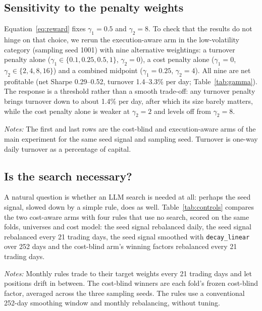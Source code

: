 \documentclass[preprint,12pt,authoryear]{elsarticle}
\newcommand{\tablenote}[1]{\par\vspace{0.4em}\begin{minipage}{\linewidth}\footnotesize #1\end{minipage}}
\begin{document}
\subsection{Sensitivity to the penalty weights}\label{sec:gamma}

Equation~\eqref{eq:reward} fixes $\gamma_1 = 0.5$ and $\gamma_2 = 8$. To check that the results do not hinge on that choice, we rerun the execution-aware arm in the low-volatility category (sampling seed 1001) with nine alternative weightings: a turnover penalty alone ($\gamma_1 \in \{0.1, 0.25, 0.5, 1\}$, $\gamma_2 = 0$), a cost penalty alone ($\gamma_1 = 0$, $\gamma_2 \in \{2, 4, 8, 16\}$) and a combined midpoint ($\gamma_1 = 0.25$, $\gamma_2 = 4$). All nine are net profitable (net Sharpe 0.29--0.52, turnover 1.4--3.3\% per day; Table~\ref{tab:gamma}). The response is a threshold rather than a smooth trade-off: any turnover penalty brings turnover down to about 1.4\% per day, after which its size barely matters, while the cost penalty alone is weaker at $\gamma_2 = 2$ and levels off from $\gamma_2 = 8$.

\begin{table}[t]
\centering
\caption{Penalty-weight sensitivity: execution-aware arm, low-volatility seed, LLM sampling seed 1001.}
\label{tab:gamma}
\footnotesize

\tablenote{\emph{Notes:} The first and last rows are the cost-blind and execution-aware arms of the main experiment for the same seed signal and sampling seed. Turnover is one-way daily turnover as a percentage of capital.}
\end{table}

\subsection{Is the search necessary?}\label{sec:controls}

A natural question is whether an LLM search is needed at all: perhaps the seed signal, slowed down by a simple rule, does as well. Table~\ref{tab:controls} compares the two cost-aware arms with four rules that use no search, scored on the same folds, universes and cost model: the seed signal rebalanced daily, the seed signal rebalanced every 21 trading days, the seed signal smoothed with \texttt{decay\_linear} over 252 days and the cost-blind arm's winning factors rebalanced every 21 trading days.

\begin{table}[t]
\centering
\caption{Comparison with rules that use no search: out-of-sample net Sharpe ratio (Net SR) and daily turnover (TO), 2006--2026.}
\label{tab:controls}
\footnotesize
\resizebox{\linewidth}{!}{}
\tablenote{\emph{Notes:} Monthly rules trade to their target weights every 21 trading days and let positions drift in between. The cost-blind winners are each fold's frozen cost-blind factor, averaged across the three sampling seeds. The rules use a conventional 252-day smoothing window and monthly rebalancing, without tuning.}
\end{table}
\end{document}
